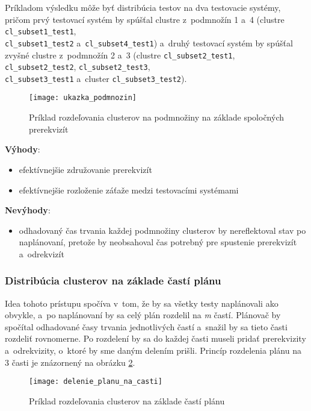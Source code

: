 Príkladom výsledku môže byť distribúcia testov na dva testovacie systémy, 
pričom prvý testovací systém by spúšťal clustre z~podmnožín 1 a~4 
(clustre \texttt{cl\_subset1\_test1}, 
\\
\texttt{cl\_subset1\_test2} a~\texttt{cl\_subset4\_test1})
a~druhý testovací systém by spúšťal zvyšné clustre z~podmnožín 2 a~3 
(clustre \texttt{cl\_subset2\_test1}, \texttt{cl\_subset2\_test2}, 
\texttt{cl\_subset2\_test3},
\\
\texttt{cl\_subset3\_test1} 
a~cluster \texttt{cl\_subset3\_test2}).

\begin{figure}[h]
  \begin{center}
    \texttt{[image: ukazka\_podmnozin]}
    \caption{Príklad rozdeľovania clusterov na podmnožiny na 
             základe spoločných prerekvizít}
    \label{obrazok:podmnoziny_testov}
  \end{center}
\end{figure}

\noindent \textbf{Výhody}:
\begin{itemize}
\item efektívnejšie združovanie prerekvizít
\item efektívnejšie rozloženie záťaže medzi testovacími systémami
\end{itemize} 


\noindent \textbf{Nevýhody}:
\begin{itemize}
\item odhadovaný čas trvania každej podmnožiny clusterov by nereflektoval stav 
po naplánovaní, pretože by neobsahoval čas potrebný pre spustenie 
prerekvizít a~odrekvizít
\end{itemize}

\subsubsection*{Distribúcia clusterov na základe častí plánu}
Idea tohoto prístupu spočíva v~tom, že by sa všetky testy naplánovali 
ako obvykle, a~po naplánovaní by sa celý plán rozdelil na \emph{m} častí. 
Plánovač by spočítal odhadované časy trvania jednotlivých častí a~snažil by 
sa tieto časti rozdeliť rovnomerne. Po rozdelení by sa do každej časti 
museli pridať prerekvizity a~odrekvizity, o~ktoré by sme daným 
delením prišli. 
Princíp rozdelenia plánu na 3 časti je znázornený na obrázku 
\ref{obrazok:distribucia_na_casti}.

\begin{figure}[h]
  \begin{center}
    \texttt{[image: delenie\_planu\_na\_casti]}
    \caption{Príklad rozdeľovania clusterov na základe častí plánu}
    \label{obrazok:distribucia_na_casti}
  \end{center}
\end{figure}

